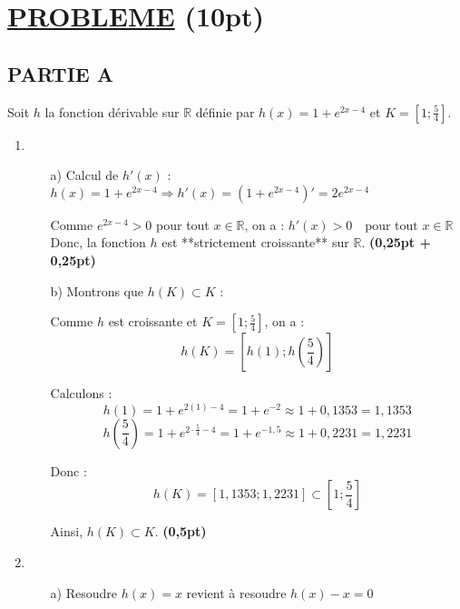 \documentclass[12pt]{article}
\begin{document}
\section*{\underline{PROBLEME} \hfill (10pt)}

\subsection*{PARTIE A}

Soit \( h \) la fonction dérivable sur \( \mathbb{R} \) définie par \( h(x) = 1 + e^{2x - 4} \) et \( K = \left[ 1 ; \frac{5}{4} \right] \).

\begin{enumerate}
    \item 
    \begin{enumerate}
        \item[a)] Calcul de \( h'(x) \) :
        \(
        h(x) = 1 + e^{2x - 4} \Rightarrow h'(x) =  \left(1 + e^{2x - 4} \right)' = 2e^{2x - 4}
        \)
        
        Comme \( e^{2x - 4} > 0 \) pour tout \( x \in \mathbb{R} \), on a :
        \(
        h'(x) > 0 \quad \text{pour tout } x \in \mathbb{R}
        \)
        Donc, la fonction \( h \) est **strictement croissante** sur \( \mathbb{R} \). \hfill \textbf{(0,25pt + 0,25pt)}

        \item[b)] Montrons que \( h(K) \subset K \) :

        Comme \( h \) est croissante et \( K = \left[1 ; \frac{5}{4}\right] \), on a :
        \[
        h(K) = \left[ h(1) ; h\left(\frac{5}{4}\right) \right]
        \]

        Calculons :
        \[
        h(1) = 1 + e^{2(1) - 4} = 1 + e^{-2} \approx 1 + 0{,}1353 = 1{,}1353
        \]
        \[
        h\left(\frac{5}{4}\right) = 1 + e^{2 \cdot \frac{5}{4} - 4} = 1 + e^{-1{,}5} \approx 1 + 0{,}2231 = 1{,}2231
        \]

        Donc :
        \[
        h(K) = \left[1{,}1353 ; 1{,}2231\right] \subset \left[1 ; \frac{5}{4}\right]
        \]

        Ainsi, \( h(K) \subset K \). \hfill \textbf{(0,5pt)}
    \end{enumerate}
        \item 
    \begin{enumerate}
        \item[a)] Resoudre \( h(x) = x \)  revient à resoudre \( h(x) - x = 0 \)
        

\end{enumerate}
\end{enumerate}
\end{document}
